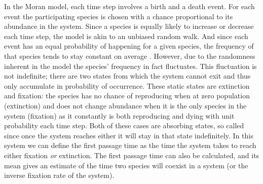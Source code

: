 In the Moran model, each time step involves a birth and a death event.
For each event the participating species is chosen with a chance proportional to its abundance in the system. 
Since a species is equally likely to increase or decrease each time step, the model is akin to an unbiased random walk. %
And since each event has an equal probability of happening for a given species, the frequency of that species tends to stay constant on average \cite{Kimura1955,Moran1962}. 
However, due to the randomness inherent in the model the species' frequency in fact fluctuates. 
This fluctuation is not indefinite; there are two states from which the system cannot exit and thus only accumulate in probability of occurrence. 
These static states are extinction and fixation: the species has no chance of reproducing when at zero population (extinction) and does not change abundance when it is the only species in the system (fixation) as it constantly is both reproducing and dying with unit probability each time step. 
Both of these cases are absorbing states, so called since once the system reaches either it will stay in that state indefinitely. 
In this system we can define the first passage time as the time the system takes to reach either fixation \emph{or} extinction. 
The first passage time can also be calculated, and its mean gives an estimate of the time two species will coexist in a system (or the inverse fixation rate of the system). 


